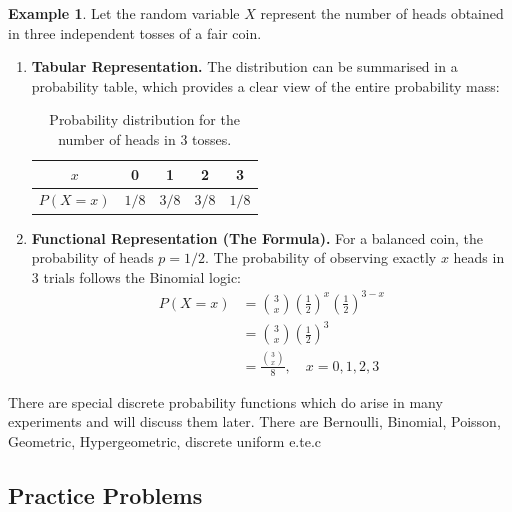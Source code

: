\documentclass[12pt,a4paper]{report}
\theoremstyle{definition}
\newtheorem{example}[thm]{Example}
\theoremstyle{plain}
\theoremstyle{definition}
\begin{document}
\begin{example}
Let the random variable $X$ represent the number of heads obtained in three independent tosses of a fair coin.
\begin{enumerate}
\item \textbf{Tabular Representation.} The distribution can be summarised in a probability table, which provides a clear view of the entire probability mass:
\begin{table}[H]
\centering\renewcommand{\arraystretch}{1.5}
\begin{tabular}{|c|c|c|c|c|}
\hline
$x$ & 0 & 1 & 2 & 3\\ 
\hline
$P(X=x)$ & $1/8$ & $3/8$ & $3/8$ & $1/8$\\ 
\hline
\end{tabular}
\caption{Probability distribution for the number of heads in 3 tosses.}
\end{table}

\item \textbf{Functional Representation (The Formula).} For a balanced coin, the probability of heads $p = 1/2$. The probability of observing exactly $x$ heads in 3 trials follows the Binomial logic:
\[\begin{aligned}
P(X=x) &= \binom{3}{x} \left( \frac{1}{2} \right)^x \left( \frac{1}{2} \right)^{3-x} \\
&= \binom{3}{x} \left(\frac{1}{2} \right)^3 \\
& = \frac{\binom{3}{x}}{8}, \quad x = 0, 1, 2, 3
\end{aligned}\]
\end{enumerate}
\end{example}



There are special discrete probability functions which do arise in many experiments and will discuss them later. There are Bernoulli, Binomial, Poisson, Geometric, Hypergeometric, discrete uniform e.te.c









\subsection{Practice Problems}
\end{document}

